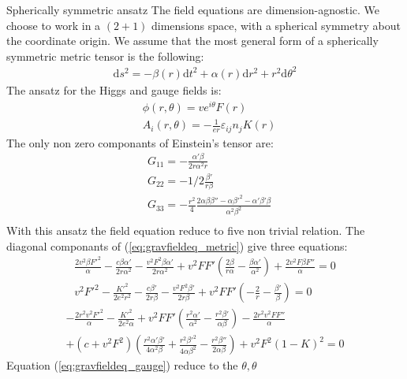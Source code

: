 \begin{subsection}{Spherically symmetric ansatz}
  The field equations are dimension-agnostic. We choose to work in a
  $(2+1)$ dimensions space, with a spherical symmetry about the
  coordinate origin. We assume that the most general form of a
  spherically symmetric metric tensor is the following:
  \begin{align}
    \mathrm{d}s^2 = -\beta(r)\mathrm{d}t^2+\alpha(r)\mathrm{d}r^2 + r^2\mathrm{d}\theta^2
  \end{align}
  The ansatz for the Higgs and gauge fields is:
  \begin{align}
    &\phi(r,\theta) = ve^{i\theta}F(r)\\
    &A_i(r,\theta) = -\frac{1}{er}\varepsilon_{ij}n_jK(r)
  \end{align}
 The only non zero componants of Einstein's tensor are:
  \begin{align}
    &G_{11} = -\frac { \alpha' \beta }{ 2r \alpha^{2}r}\\
    &G_{22} =   -1/2\frac {\beta' }{r\beta}\\
    &G_{33} =   -\frac{{r}^{2}}{4} \frac{ 2\alpha\beta\beta'' - \alpha\beta'^2 - \alpha'\beta'\beta}{ \alpha^2 \beta^2}\\
  \end{align}
  With this ansatz the field equation reduce to five non trivial
  relation. The diagonal componants of (\ref{eq:gravfieldeq_metric})
  give three equations:
  \begin{align}
\frac{2 v^2 \beta  F'^2}{\alpha }-\frac{c \beta  \alpha '}{2 r \alpha ^2}-\frac{v^2 F^2 \beta  \alpha '}{2 r \alpha ^2}+v^2 F F' \left(\frac{2 \beta }{r \alpha }-\frac{\beta  \alpha '}{\alpha ^2}\right)+\frac{2 v^2 F \beta  F''}{\alpha }=0\\
    v^2 F'^2-\frac{K'^2}{2 e^2 r^2}-\frac{c \beta '}{2 r \beta }-\frac{v^2 F^2 \beta '}{2 r \beta }+v^2 F F' \left(-\frac{2}{r}-\frac{\beta '}{\beta }\right) = 0
  \end{align}
  \begin{multline}
    -\frac{2 r^2 v^2 F'^2}{\alpha }-\frac{K'^2}{2 e^2 \alpha }+v^2 F F' \left(\frac{r^2 \alpha '}{\alpha ^2}-\frac{r^2 \beta '}{\alpha  \beta }\right)-\frac{2 r^2 v^2 F F''}{\alpha }\\
        +(c+v^2F^2) \left(\frac{r^2 \alpha ' \beta '}{4 \alpha ^2 \beta }+\frac{r^2 \beta '^2}{4 \alpha  \beta ^2}-\frac{r^2 \beta ''}{2 \alpha  \beta }\right)+v^2 F^2 (1-K)^2 = 0
  \end{multline}
  Equation (\ref{eq:gravfieldeq_gauge}) reduce to the $\theta,\theta$

\end{subsection}

